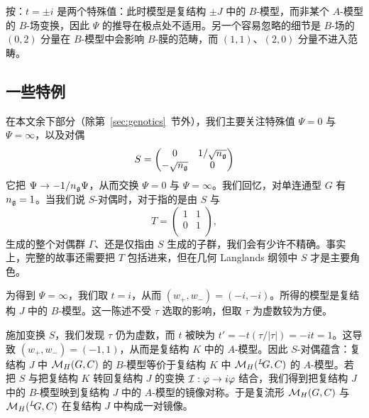 \begin{yizhu}[易错点]
按：$t=\pm i$ 是两个特殊值：此时模型是复结构 $\pm J$ 中的 $B$-模型，而非某个 $A$-模型的 $B$-场变换，因此 $\Psi$ 的推导在极点处不适用。另一个容易忽略的细节是 $B$-场的 $(0,2)$ 分量在 $B$-模型中会影响 $B$-膜的范畴，而 $(1,1)$、$(2,0)$ 分量不进入范畴。
\end{yizhu}

\subsection{一些特例}

\label{sec:somespec}

在本文余下部分（除第~\ref{sec:genotics}~节外），我们主要关注特殊值 $\Psi=0$ 与 $\Psi=\infty$，以及对偶 %
\setcounter{equation}{34}
\begin{equation}\label{eq:rtu}
S=\left(\begin{matrix}0 & 1/\sqrt {n_{\frak
g}}\\ -\sqrt {n_{\frak g}}& 0\\\end{matrix}\right)
\end{equation}
它把 $\Psi\to -1/n_{\frak g}\Psi$，从而交换 $\Psi=0$ 与 $\Psi=\infty$。我们回忆，对单连通型 $G$ 有 $n_{\frak g}=1$。当我们说 $S$-对偶时，对于指的是由 $S$ 与 %
\setcounter{equation}{35}
\begin{equation}\label{eq:ntu}
T=\left(\begin{matrix}1 & 1\\ 0& 1\\\end{matrix}\right),
\end{equation}
生成的整个对偶群 $\Gamma$、还是仅指由 $S$ 生成的子群，我们会有少许不精确。事实上，完整的故事还需要把 $T$ 包括进来，但在几何 Langlands 纲领中 $S$ 才是主要角色。

为得到 $\Psi=\infty$，我们取 $t=i$，从而 $(w_+,w_-)=(-i,-i)$。所得的模型是复结构 $J$ 中的 $B$-模型。这一陈述不受 $\tau$ 选取的影响，但取 $\tau$ 为虚数较为方便。

施加变换 $S$，我们发现 $\tau$ 仍为虚数，而 $t$ 被映为 $t'=-t({\tau}/|\tau|)=-it=1$。这导致 $(w_+,w_-)=(-1,1)$，从而是复结构 $K$ 中的 $A$-模型。因此 $S$-对偶蕴含：复结构 $J$ 中 $\MH(G,C)$ 的 $B$-模型等价于复结构 $K$ 中 $\MH(\LG,C)$ 的 $A$-模型。若把 $S$ 与把复结构 $K$ 转回复结构 $J$ 的变换 ${\EUI}:\varphi\to i\varphi$ 结合，我们得到把复结构 $J$ 中的 $B$-模型映到复结构 $J$ 中的 $A$-模型的镜像对称。于是复流形 $\MH(G,C)$ 与 $\MH(\LG,C)$ 在复结构 $J$ 中构成一对镜像。

